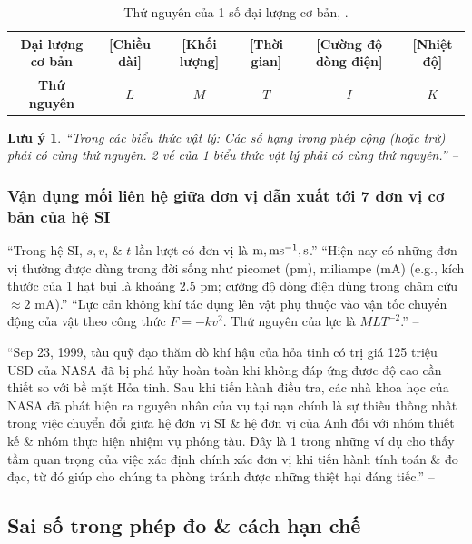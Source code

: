 \documentclass[oneside]{book}
\numberwithin{equation}{section}
\newtheorem{luuy}{Lưu ý}[section]
\begin{document}
\begin{table}[H]
	\centering
	\begin{tabular}{|c|c|c|c|c|c|}
		\hline
		\textbf{Đại lượng cơ bản} & [Chiều dài] & [Khối lượng] & [Thời gian] & [Cường độ dòng điện] & [Nhiệt độ] \\
		\hline
		\textbf{Thứ nguyên} & $L$ & $M$ & $T$ & $I$ & $K$ \\
		\hline
	\end{tabular}
	\caption{Thứ nguyên của 1 số đại lượng cơ bản, \cite[Bảng 3.3, p. 16]{SGK_Vat_Ly_10_Chan_Troi_Sang_Tao}.}
	\label{tab:thu nguyen cua 1 so dai luong co ban}
\end{table}

\begin{luuy}
	``Trong các biểu thức vật lý: Các số hạng trong phép cộng (hoặc trừ) phải có cùng thứ nguyên. 2 vế của 1 biểu thức vật lý phải có cùng thứ nguyên.'' -- \cite[p. 17]{SGK_Vat_Ly_10_Chan_Troi_Sang_Tao}
\end{luuy}

\subsubsection{Vận dụng mối liên hệ giữa đơn vị dẫn xuất tới 7 đơn vị cơ bản của hệ SI}
``Trong hệ SI, $s,v$, \& $t$ lần lượt có đơn vị là $\rm m,ms^{-1},s$.'' ``Hiện nay có những đơn vị thường được dùng trong đời sống như picomet (pm), miliampe (mA) (e.g., kích thước của 1 hạt bụi là khoảng $2.5$ pm; cường độ dòng điện dùng trong châm cứu $\approx2$ mA).'' ``Lực cản không khí tác dụng lên vật phụ thuộc vào vận tốc chuyển động của vật theo công thức $F = -kv^2$. Thứ nguyên của lực là $MLT^{-2}$.'' -- \cite[p. 17]{SGK_Vat_Ly_10_Chan_Troi_Sang_Tao}

``Sep 23, 1999, tàu quỹ đạo thăm dò khí hậu của hỏa tinh có trị giá 125 triệu USD của NASA đã bị phá hủy hoàn toàn khi không đáp ứng được độ cao cần thiết so với bề mặt Hỏa tinh. Sau khi tiến hành điều tra, các nhà khoa học của NASA đã phát hiện ra nguyên nhân của vụ tại nạn chính là sự thiếu thống nhất trong việc chuyển đổi giữa hệ đơn vị SI \& hệ đơn vị của Anh đối với nhóm thiết kế \& nhóm thực hiện nhiệm vụ phóng tàu. Đây là 1 trong những ví dụ cho thấy tầm quan trọng của việc xác định chính xác đơn vị khi tiến hành tính toán \& đo đạc, từ đó giúp cho chúng ta phòng tránh được những thiệt hại đáng tiếc.'' -- \cite[p. 18]{SGK_Vat_Ly_10_Chan_Troi_Sang_Tao}

\subsection{Sai số trong phép đo \& cách hạn chế}
\end{document}
